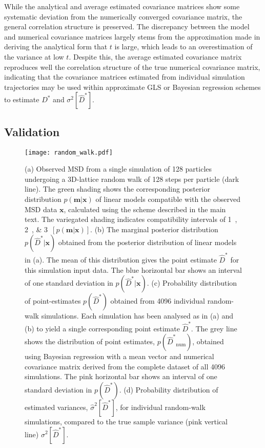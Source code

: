 \documentclass[reprint,superscriptaddress,nobibnotes,amsmath,amssymb,aps,prx,hidelinks,linenumbers]{revtex4-2}
\newcommand{\oMSD}{\ensuremath{\bm{x}}}
\newcommand{\model}{\bm{m}}
\newcommand{\prob}[1]{\ensuremath{p(#1)}}
\newcommand{\Dest}{\ensuremath{\widehat{D}^*}}
\newcommand{\D}{\ensuremath{D^*}}
\newcommand{\var}[1]{\ensuremath{\sigma^2[#1]}}
\newcommand{\varest}[1]{\ensuremath{\widehat{\sigma}^2[#1]}}
\begin{document}
While the analytical and average estimated covariance matrices show some systematic deviation from the numerically converged covariance matrix, the general correlation structure is preserved.
The discrepancy between the model and numerical covariance matrices largely stems from the approximation made in deriving the analytical form that $t$ is large, which leads to an overestimation of the variance at low $t$.
Despite this, the average estimated covariance matrix reproduces well the correlation structure of the true numerical covariance matrix, indicating that the covariance matrices estimated from individual simulation trajectories may be used within approximate GLS or Bayesian regression schemes to estimate $\D$ and $\var{\Dest}$.

\subsection{Validation}

\begin{figure*}[ht!]
    \centering
    \texttt{[image: random\_walk.pdf]}
    \caption{
        (a) Observed MSD from a single simulation of 128 particles undergoing a 3D-lattice random walk of 128 steps per particle (dark line).
        The green shading shows the corresponding posterior distribution $\prob{\model|\oMSD}$ of linear models compatible with the observed MSD data $\oMSD$, calculated using the scheme described in the main text.
        The variegated shading indicates compatibility intervals of \SIlist[list-final-separator = {, and }]{1;2;3}{\sigma}$[\prob{\model|\oMSD}]$.
        (b) The marginal posterior distribution $\prob{\Dest|\oMSD}$ obtained from the posterior distribution of linear models in (a).
        The mean of this distribution gives the point estimate $\Dest$ for this simulation input data.
        The blue horizontal bar shows an interval of one standard deviation in $\prob{\Dest|\oMSD}$.
        (c) Probability distribution of point-estimates $\prob{\Dest}$ obtained from \num{4096} individual random-walk simulations.
        Each simulation has been analysed as in (a) and (b) to yield a single corresponding point estimate $\Dest$.
        The grey line shows the distribution of point estimates, $\prob{\Dest_\mathrm{num}}$, obtained using Bayesian regression with a mean vector and numerical covariance matrix derived from the complete dataset of all \num{4096} simulations.
        The pink horizontal bar shows an interval of one standard deviation in $\prob{\Dest}$.
        (d) Probability distribution of estimated variances, $\varest{\Dest}$, for individual random-walk simulations, compared to the true sample variance (pink vertical line) $\var{\Dest}$.
    } 
    \label{fig:random_walk}
\end{figure*}
\end{document}
